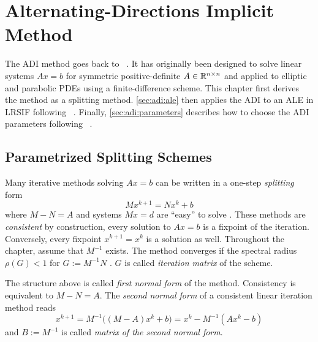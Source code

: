 \chapter{Alternating-Directions Implicit Method}
\label{sec:ADI}

The \acf{ADI} method goes back to \citeauthor{Peaceman1955}~\cite{Peaceman1955}.
It has originally been designed to solve linear systems
$Ax=b$
for symmetric positive-definite $A\in\mathbb{R}^{n\times n}$
and applied to elliptic and parabolic \acp{PDE} using a finite-difference scheme.
This chapter first derives the method as a splitting method.
\autoref{sec:adi:ale} then applies the \ac{ADI} to an \ac{ALE} in \ac{LRSIF} following \citeauthor{Lang2017}~\cite{Lang2017}.
Finally, \autoref{sec:adi:parameters} describes how to choose the \ac{ADI} parameters following \citeauthor{Kuerschner2016}~\cite{Kuerschner2016}.

\section{Parametrized Splitting Schemes}

Many iterative methods solving $Ax=b$ can be written in a one-step \emph{splitting} form
\begin{equation}
  Mx^{k+1} = Nx^k + b
\end{equation}
where $M-N = A$ and systems $Mx = d$ are \enquote{easy} to solve \cite[Section~11.2.3]{Golub2013}.
These methods are \emph{consistent} by construction,
\ie every solution to $Ax=b$ is a fixpoint of the iteration.
Conversely, every fixpoint $x^{k+1} = x^k$ is a solution as well.
Throughout the chapter, assume that $M^{-1}$ exists.
The method converges if the spectral radius $\rho(G) < 1$ for $G:=M^{-1}N$ \cite[Theorem~11.2.1]{Golub2013}.
$G$ is called \emph{iteration matrix} of the scheme.

The structure above is called \emph{first normal form} of the method.
Consistency is equivalent to $M-N=A$.
The \emph{second normal form} of a consistent linear iteration method reads
\begin{equation}
  x^{k+1} = M^{-1} \big( (M-A) x^k + b \big) = x^k - M^{-1} (Ax^k - b)
\end{equation}
and $B := M^{-1}$ is called \emph{matrix of the second normal form}.

